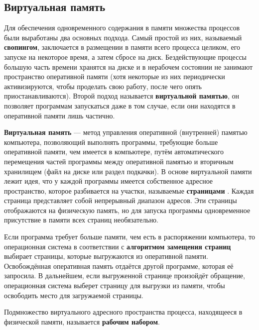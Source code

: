 \subsection{Виртуальная память}

Для обеспечения одновременного содержания в памяти множества процессов были выработаны два основных подхода. Самый простой из них, называемый \textbf{свопингом}, заключается в размещении в памяти всего процесса целиком, его запуске на некоторое время, а затем сбросе на диск. Бездействующие процессы большую часть времени хранятся на диске и в нерабочем состоянии не занимают пространство оперативной памяти (хотя некоторые из них периодически активизируются, чтобы проделать свою работу, после чего опять приостанавливаются). Второй подход называется \textbf{виртуальной памятью}, он позволяет программам запускаться даже в том случае, если они находятся в оперативной памяти лишь частично.

\textbf{Виртуальная память} --- метод управления оперативной (внутренней) памятью компьютера, позволяющий выполнять программы, требующие больше оперативной памяти, чем имеется в компьютере, путём автоматического перемещения частей программы между оперативной памятью и вторичным хранилищем (файл на диске или раздел подкачки). В основе виртуальной памяти лежит идея, что у каждой программы имеется собственное адресное пространство, которое разбивается на участки, называемые \textbf{страницами} \cite{tannenbaum}. Каждая страница представляет собой непрерывный диапазон адресов. Эти страницы отображаются на физическую память, но для запуска программы одновременное присутствие в памяти всех страниц необязательно.

Если программа требует больше памяти, чем есть в распоряжении компьютера, то операционная система в соответствии с \textbf{алгоритмом замещения страниц} \cite{tannenbaum} выбирает страницы, которые выгружаются из оперативной памяти. Освобождённая оперативная память отдаётся другой программе, которая её запросила. В дальнейшем, если выгруженной странице произойдёт обращение, операционная система выберет страницу для выгрузки из памяти, чтобы освободить место для загружаемой страницы.

Подмножество виртуального адресного пространства процесса, находящееся в физической памяти, называется \textbf{рабочим набором}. \cite{windows}


